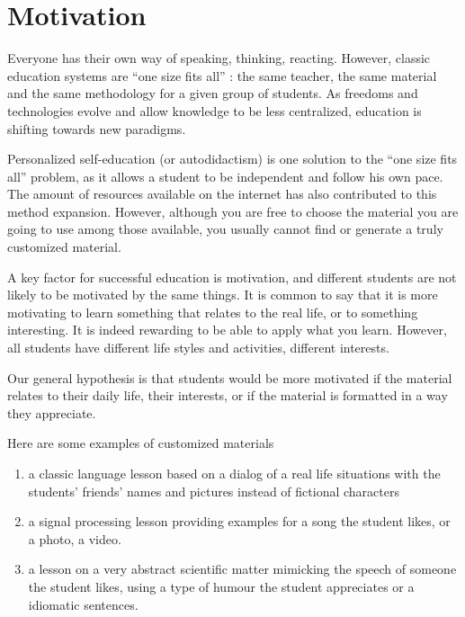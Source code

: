 \documentclass[a4paper,12pt]{article}
\begin{document}
\maketitle
\tableofcontents
\newpage


\section{Motivation}

Everyone has their own way of speaking, thinking, reacting. However, classic education systems are ``one size fits all'' : the same teacher, the same material and the same methodology for a given group of students. As freedoms and technologies evolve and allow knowledge to be less centralized, education is shifting towards new paradigms.

Personalized self-education (or autodidactism) is one solution to the ``one size fits all'' problem, as it allows a student to be independent and follow his own pace. The amount of resources available on the internet has also contributed to this method expansion. However, although you are free to choose the material you are going to use among those available, you usually cannot find or generate a truly customized material.

A key factor for successful education is motivation, and different students are not likely to be motivated by the same things. It is common to say that it is more motivating to learn something that relates to the real life, or to something interesting. It is indeed rewarding to be able to apply what you learn. However, all students have different life styles and activities, different interests.

Our general hypothesis is that students would be more motivated if the material relates to their daily life, their interests, or if the material is formatted in a way they appreciate.

Here are some examples of customized materials

\begin{enumerate}
\item a classic language lesson based on a dialog of a real life situations with the students' friends' names and pictures instead of fictional characters
\item a signal processing lesson providing examples for a song the student likes, or a photo, a video.
\item a lesson on a very abstract scientific matter mimicking the speech of someone the student likes, using a type of humour the student appreciates or a idiomatic sentences.
\end{enumerate}
\end{document}
